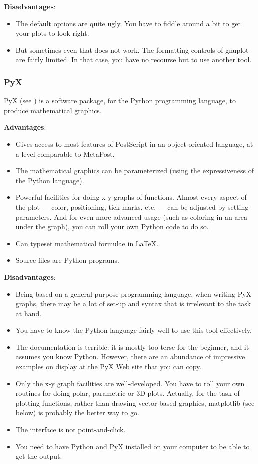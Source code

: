 \textbf{Disadvantages}:
\begin{itemize}
\item
The default options are quite ugly. You have to fiddle around a bit to get your plots to look right.
\item
But sometimes even that does not work. The formatting controls of gnuplot are fairly limited. In that case, you have no recourse but to use another tool.
\end{itemize}

\subsubsection*{PyX}

PyX (see ) is a software package, for the Python programming language, to produce mathematical graphics.

\textbf{Advantages}:
\begin{itemize}
\item
Gives access to most features of PostScript in an object-oriented language, at a level comparable to MetaPost.
\item
The mathematical graphics can be parameterized (using the expressiveness of the Python language).
\item
Powerful facilities for doing x-y graphs of functions. Almost every aspect of the plot --- color, positioning, tick marks, etc. --- can be adjusted by setting parameters. And for even more advanced usage (such as coloring in an area under the graph), you can roll your own Python code to do so.
\item
Can typeset mathematical formulae in LaTeX.
\item
Source files are Python programs.
\end{itemize}

\textbf{Disadvantages}:
\begin{itemize}
\item
Being based on a general-purpose programming language, when writing PyX graphs, there may be a lot of set-up and syntax that is irrelevant to the task at hand.
\item
You have to know the Python language fairly well to use this tool effectively.
\item
The documentation is terrible: it is mostly too terse for the beginner, and it assumes you know Python. However, there are an abundance of impressive examples on display at the PyX Web site that you can copy.
\item
Only the x-y graph facilities are well-developed. You have to roll your own routines for doing polar, parametric or 3D plots. Actually, for the task of plotting functions, rather than drawing vector-based graphics, matplotlib (see below) is probably the better way to go.
\item
The interface is not point-and-click.
\item
You need to have Python and PyX installed on your computer to be able to get the output.
\end{itemize}

